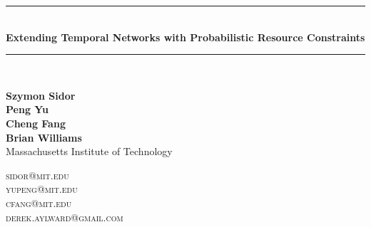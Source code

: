 \documentclass{article}
\newcommand{\HRule}{\rule{\linewidth}{0.5mm}}
\begin{document}
\thispagestyle{empty}

\begin{center}
\HRule \\[0.3cm]
{\Large \bfseries Extending Temporal Networks with Probabilistic Resource Constraints \\[0.3cm]}
\HRule \\[0.5cm]

\noindent
\begin{minipage}{0.5\textwidth}
\begin{flushleft}
\textbf{Szymon Sidor\\
Peng Yu\\
Cheng Fang\\
Brian Williams}\\
Massachusetts Institute of Technology
\end{flushleft}
\end{minipage}%
\begin{minipage}{0.5\textwidth}
\begin{flushright}
\textsc{sidor@mit.edu}\\
\textsc{yupeng@mit.edu}\\
\textsc{cfang@mit.edu}\\
\textsc{derek.aylward@gmail.com}\\
$\ $
\end{flushright}
\end{minipage}
\\[1cm]
\end{center}
\pagestyle{fancy}
\end{document}
